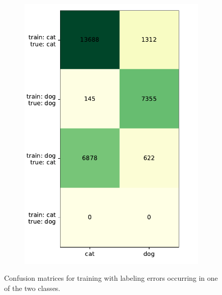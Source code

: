 \documentclass[a4paper,11pt]{scrartcl}
\theoremstyle{definition}
\begin{document}
\begin{figure}[!h]
\begin{subfigure}[t]{0.32\textwidth}
\includegraphics[width=0.99\textwidth]{Plots_1/compound_3000_50_00_no_Title.pdf}
\label{subfig:confusion_50_00}
\end{subfigure}
\caption[Confusion matrices for labeling errors in one class.]{Confusion matrices for training with labeling errors occurring in one of the two classes.}
\label{fig:onesided_confusion_matrix}
\end{figure}

\end{document}

